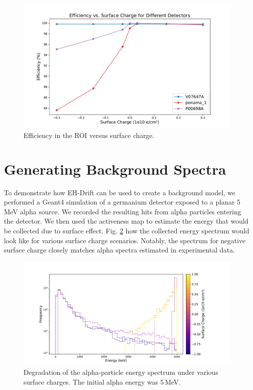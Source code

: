 \begin{figure}
\includegraphics[trim={1.6cm 0.3cm 2cm 1.8cm},clip,width=\linewidth]{ch5/figs/efficiency_0nbb.pdf}
\caption{Efficiency in the ROI versus surface charge.}
\label{fig:efficiency_sc_plot}
\end{figure}


\section{\label{res:3} Generating Background Spectra}

To demonstrate how EH-Drift can be used to create a background model, we performed a Geant4 simulation of a germanium detector exposed to a planar 5\,MeV alpha source. We recorded the resulting hits from alpha particles entering the detector. We then used the activeness map to estimate the energy that would be collected due to surface effect. Fig. \ref{fig:eng_spec_degradation} how the collected energy spectrum would look like for various surface charge scenarios. Notably, the spectrum for negative surface charge closely matches alpha spectra estimated in experimental data.

\begin{figure}[t]
  \centering

  \includegraphics[trim={2cm 0.5cm 4.5cm 1.7cm},clip,width=\linewidth]{ch5/figs/eng_deg_hist.pdf}
  \caption{Degradation of the alpha-particle energy spectrum under various surface charges. The initial alpha energy was 5\,MeV.}
  \label{fig:eng_spec_degradation}
\end{figure}



